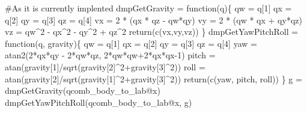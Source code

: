 \documentclass[
  letterpaper,
  DIV=11,
  numbers=noendperiod]{scrartcl}
\newenvironment{Shaded}{\begin{snugshade}}{\end{snugshade}}
\newcommand{\CommentTok}[1]{\textcolor[rgb]{0.37,0.37,0.37}{#1}}
\newcommand{\ControlFlowTok}[1]{\textcolor[rgb]{0.00,0.23,0.31}{#1}}
\newcommand{\DecValTok}[1]{\textcolor[rgb]{0.68,0.00,0.00}{#1}}
\newcommand{\FunctionTok}[1]{\textcolor[rgb]{0.28,0.35,0.67}{#1}}
\newcommand{\NormalTok}[1]{\textcolor[rgb]{0.00,0.23,0.31}{#1}}
\newcommand{\OtherTok}[1]{\textcolor[rgb]{0.00,0.23,0.31}{#1}}
\newcommand{\SpecialCharTok}[1]{\textcolor[rgb]{0.37,0.37,0.37}{#1}}
\begin{document}
\begin{Shaded}
\begin{Highlighting}[]
\CommentTok{\#As it is currently implented}
\NormalTok{dmpGetGravity }\OtherTok{=} \ControlFlowTok{function}\NormalTok{(q)\{}
\NormalTok{  qw }\OtherTok{=}\NormalTok{ q[}\DecValTok{1}\NormalTok{]}
\NormalTok{  qx }\OtherTok{=}\NormalTok{ q[}\DecValTok{2}\NormalTok{]}
\NormalTok{  qy }\OtherTok{=}\NormalTok{ q[}\DecValTok{3}\NormalTok{]}
\NormalTok{  qz }\OtherTok{=}\NormalTok{ q[}\DecValTok{4}\NormalTok{]}
\NormalTok{  vx }\OtherTok{=} \DecValTok{2} \SpecialCharTok{*}\NormalTok{ (qx }\SpecialCharTok{*}\NormalTok{ qz }\SpecialCharTok{{-}}\NormalTok{ qw}\SpecialCharTok{*}\NormalTok{qy)}
\NormalTok{  vy }\OtherTok{=} \DecValTok{2} \SpecialCharTok{*}\NormalTok{ (qw }\SpecialCharTok{*}\NormalTok{ qx }\SpecialCharTok{+}\NormalTok{ qy}\SpecialCharTok{*}\NormalTok{qz)}
\NormalTok{  vz }\OtherTok{=}\NormalTok{ qw}\SpecialCharTok{\^{}}\DecValTok{2} \SpecialCharTok{{-}}\NormalTok{ qx}\SpecialCharTok{\^{}}\DecValTok{2} \SpecialCharTok{{-}}\NormalTok{ qy}\SpecialCharTok{\^{}}\DecValTok{2} \SpecialCharTok{+}\NormalTok{ qz}\SpecialCharTok{\^{}}\DecValTok{2}
  \FunctionTok{return}\NormalTok{(}\FunctionTok{c}\NormalTok{(vx,vy,vz))}
\NormalTok{\}}
\NormalTok{dmpGetYawPitchRoll }\OtherTok{=} \ControlFlowTok{function}\NormalTok{(q, gravity)\{}
\NormalTok{  qw }\OtherTok{=}\NormalTok{ q[}\DecValTok{1}\NormalTok{]}
\NormalTok{  qx }\OtherTok{=}\NormalTok{ q[}\DecValTok{2}\NormalTok{]}
\NormalTok{  qy }\OtherTok{=}\NormalTok{ q[}\DecValTok{3}\NormalTok{]}
\NormalTok{  qz }\OtherTok{=}\NormalTok{ q[}\DecValTok{4}\NormalTok{]}
\NormalTok{  yaw }\OtherTok{=} \FunctionTok{atan2}\NormalTok{(}\DecValTok{2}\SpecialCharTok{*}\NormalTok{qx}\SpecialCharTok{*}\NormalTok{qy }\SpecialCharTok{{-}} \DecValTok{2}\SpecialCharTok{*}\NormalTok{qw}\SpecialCharTok{*}\NormalTok{qz, }\DecValTok{2}\SpecialCharTok{*}\NormalTok{qw}\SpecialCharTok{*}\NormalTok{qw}\SpecialCharTok{+}\DecValTok{2}\SpecialCharTok{*}\NormalTok{qx}\SpecialCharTok{*}\NormalTok{qx}\DecValTok{{-}1}\NormalTok{)}
\NormalTok{  pitch }\OtherTok{=} \FunctionTok{atan}\NormalTok{(gravity[}\DecValTok{1}\NormalTok{]}\SpecialCharTok{/}\FunctionTok{sqrt}\NormalTok{(gravity[}\DecValTok{2}\NormalTok{]}\SpecialCharTok{\^{}}\DecValTok{2}\SpecialCharTok{+}\NormalTok{gravity[}\DecValTok{3}\NormalTok{]}\SpecialCharTok{\^{}}\DecValTok{2}\NormalTok{))}
\NormalTok{  roll }\OtherTok{=} \FunctionTok{atan}\NormalTok{(gravity[}\DecValTok{2}\NormalTok{]}\SpecialCharTok{/}\FunctionTok{sqrt}\NormalTok{(gravity[}\DecValTok{1}\NormalTok{]}\SpecialCharTok{\^{}}\DecValTok{2}\SpecialCharTok{+}\NormalTok{gravity[}\DecValTok{3}\NormalTok{]}\SpecialCharTok{\^{}}\DecValTok{2}\NormalTok{))}
  \FunctionTok{return}\NormalTok{(}\FunctionTok{c}\NormalTok{(yaw, pitch, roll))}
\NormalTok{\}}
\NormalTok{g }\OtherTok{=} \FunctionTok{dmpGetGravity}\NormalTok{(qcomb\_body\_to\_lab}\SpecialCharTok{@}\NormalTok{x)}
\FunctionTok{dmpGetYawPitchRoll}\NormalTok{(qcomb\_body\_to\_lab}\SpecialCharTok{@}\NormalTok{x, g)}
\end{Highlighting}
\end{Shaded}
\end{document}
